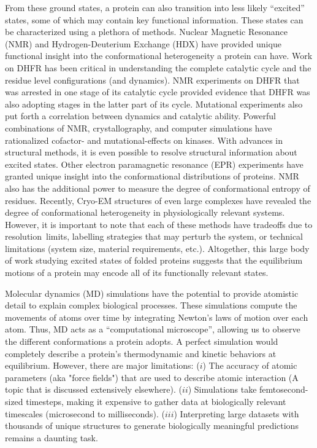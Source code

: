 \documentclass[../main.tex]{subfiles}
\begin{document}
	 From these ground states, a protein can also transition into less likely “excited” states, some of which may contain key functional information. These states can be characterized using a plethora of methods. Nuclear Magnetic Resonance (NMR) and Hydrogen-Deuterium Exchange (HDX) have provided unique functional insight into the conformational heterogeneity a protein can have\cite{baldwin_early_2011,HenzlerWildman:2007cz}. Work on DHFR has been critical in understanding the complete catalytic cycle and the residue level configurations (and dynamics)\cite{Boehr:2006jd}. NMR experiments on DHFR that was arrested in one stage of its catalytic cycle provided evidence that DHFR was also adopting stages in the latter part of its cycle\cite{Boehr:2006jd}. Mutational experiments also put forth a correlation between dynamics and catalytic ability\cite{Boehr:2006jd,Boehr:2009ju,HenzlerWildman:2007cz}. Powerful combinations of NMR, crystallography, and computer simulations have rationalized cofactor- and mutational-effects on kinases\cite{zorba_molecular_2014,kerns_energy_2015}. With advances in structural methods, it is even possible to resolve structural information about excited states\cite{Boehr:2006jd,Boehr:2009ju}. Other electron paramagnetic resonance (EPR) experiments have granted unique insight into the conformational distributions of proteins\cite{VanEps:2010by}. NMR also has the additional power to measure the degree of conformational entropy of residues\cite{Wand:2013dz}. Recently, Cryo-EM structures of even large complexes have revealed the degree of conformational heterogeneity in physiologically relevant systems\cite{Koehl:2018fv,DraperJoyce:2018il,GarciaNafria:2018hu,Kang:2018kq}. However, it is important to note that each of these methods have tradeoffs due to resolution limits, labelling strategies that may perturb the system, or technical limitations (system size, material requirements, etc.). Altogether, this large body of work studying excited states of folded proteins suggests that the equilibrium motions of a protein may encode all of its functionally relevant states. 

	Molecular dynamics (MD) simulations have the potential to provide atomistic detail to explain complex biological processes. These simulations compute the movements of atoms over time by integrating Newton’s laws of motion over each atom. Thus, MD acts as a “computational microscope”, allowing us to observe the different conformations a protein adopts\cite{Dror:2012cs,lee_discovery_2009}. A perfect simulation would completely describe a protein’s thermodynamic and kinetic behaviors at equilibrium. However, there are major limitations: ($i$) The accuracy of atomic parameters (aka "force fields") that are used to describe atomic interaction (A topic that is discussed extensively elsewhere\cite{kukol_current_2015}). ($ii$) Simulations take femtosecond-sized timesteps, making it expensive to gather data at biologically relevant timescales (microsecond to milliseconds). ($iii$) Interpreting large datasets with thousands of unique structures to generate biologically meaningful predictions remains a daunting task.
\end{document}

